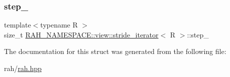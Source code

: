 \subsubsection{\texorpdfstring{step\_}{step\_}}
{\footnotesize\ttfamily template$<$typename R $>$ \\
size\+\_\+t \mbox{\hyperlink{struct_r_a_h___n_a_m_e_s_p_a_c_e_1_1view_1_1stride__iterator}{R\+A\+H\+\_\+\+N\+A\+M\+E\+S\+P\+A\+C\+E\+::view\+::stride\+\_\+iterator}}$<$ R $>$\+::step\+\_\+}



The documentation for this struct was generated from the following file\+:\begin{DoxyCompactItemize}
\item 
rah/\mbox{\hyperlink{rah_8hpp}{rah.\+hpp}}\end{DoxyCompactItemize}
